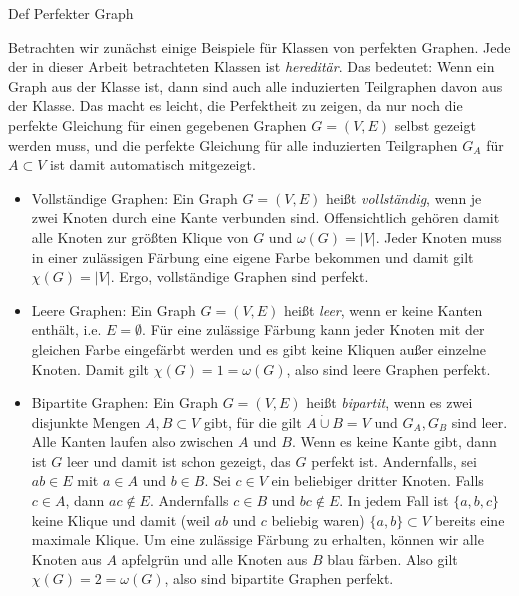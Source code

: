 \documentclass[../main.tex]{subfiles}
\begin{document}
Def Perfekter Graph


Betrachten wir zunächst einige Beispiele für Klassen von perfekten Graphen. Jede der in dieser Arbeit betrachteten Klassen ist \emph{hereditär}. Das bedeutet: Wenn ein Graph aus der Klasse ist, dann sind auch alle induzierten Teilgraphen davon aus der Klasse. Das macht es leicht, die Perfektheit zu zeigen, da nur noch die perfekte Gleichung für einen gegebenen Graphen $G = (V, E)$ selbst gezeigt werden muss, und die perfekte Gleichung für alle induzierten Teilgraphen $G_A$ für $A \subset V$ ist damit automatisch mitgezeigt.

\begin{itemize}
    \item Vollständige Graphen: Ein Graph $G = (V, E)$ heißt \emph{vollständig}, wenn je zwei Knoten durch eine Kante verbunden sind. Offensichtlich gehören damit alle Knoten zur größten Klique von $G$ und $\omega(G) = |V|$. Jeder Knoten muss in einer zulässigen Färbung eine eigene Farbe bekommen und damit gilt $\chi(G) = |V|$. Ergo, vollständige Graphen sind perfekt.
    \item Leere Graphen: Ein Graph $G = (V, E)$ heißt \emph{leer}, wenn er keine Kanten enthält, i.e. $E = \emptyset$. Für eine zulässige Färbung kann jeder Knoten mit der gleichen Farbe eingefärbt werden und es gibt keine Kliquen außer einzelne Knoten. Damit gilt $\chi(G) = 1 = \omega(G)$, also sind leere Graphen perfekt.
    \item Bipartite Graphen: Ein Graph $G = (V, E)$ heißt \emph{bipartit}, wenn es zwei disjunkte Mengen $A, B \subset V$ gibt, für die gilt $A \dot\cup B = V$ und $G_A, G_B$ sind leer. Alle Kanten laufen also zwischen $A$ und $B$. Wenn es keine Kante gibt, dann ist $G$ leer und damit ist schon gezeigt, das $G$ perfekt ist. Andernfalls, sei $ab \in E$ mit $a \in A$ und $b \in B$. Sei $c \in V$ ein beliebiger dritter Knoten. Falls $c \in A$, dann $ac \notin E$. Andernfalls $c \in B$ und $bc \notin E$. In jedem Fall ist $\{a, b, c\}$ keine Klique und damit (weil $ab$ und $c$ beliebig waren) $\{a, b\} \subset V$ bereits eine maximale Klique. Um eine zulässige Färbung zu erhalten, können wir alle Knoten aus $A$ apfelgrün und alle Knoten aus $B$ blau färben. Also gilt $\chi(G) = 2 = \omega(G)$, also sind bipartite Graphen perfekt.
\end{itemize}
\end{document}
